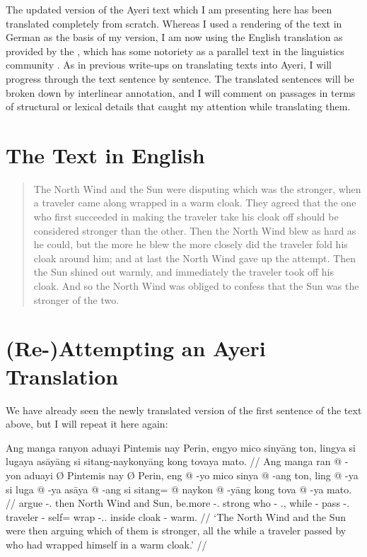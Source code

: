 \documentclass[12pt,paper=a4]{scrartcl}
\begin{document}
The updated version of the Ayeri text which I am presenting here has been translated completely from scratch. Whereas I used a rendering of the text in German as the basis of my \citeyear{becker2004} version, I am now using the English translation as provided by the , which has some notoriety as a parallel text in the linguistics community \autocite[see e.g.][97]{cysouwwälchli2007}. As in previous write-ups on translating texts into Ayeri, I will progress through the text sentence by sentence. The translated sentences will be broken down by interlinear annotation, and I will comment on passages in terms of structural or lexical details that caught my attention while translating them.

\section{The Text in English}

\blockcquote[???]{ipa2007}{The North Wind and the Sun were disputing which was the stronger, when a traveler came along wrapped in a warm cloak. They agreed that the one who first succeeded in making the traveler take his cloak off should be considered stronger than the other. Then the North Wind blew as hard as he could, but the more he blew the more closely did the traveler fold his cloak around him; and at last the North Wind gave up the attempt. Then the Sun shined out warmly, and immediately the traveler took off his cloak. And so the North Wind was obliged to confess that the Sun was the stronger of the two.}

\section{(Re-)Attempting an Ayeri Translation}

We have already seen the newly translated version of the first sentence of the text above, but I will repeat it here again:

\ex %
\begingl
	\glpreamble Ang manga ranyon aduayi Pintemis nay Perin, engyo mico sinyāng ton, lingya si lugaya asāyāng si sitang-naykonyāng kong tovaya mato. //
	\gla Ang manga ran @ -yon aduayi Ø Pintemis nay Ø Perin, eng @ -yo mico sinya @ -ang ton, ling @ -ya si luga @ -ya asāya @ -ang si sitang= @ naykon @ -yāng kong tova @ -ya mato. //
	\glb \AgtT{} \Prog{} argue -\Tpl{}.\N{} then \Top{} {North Wind} and \Top{} Sun, be.more -\Tsg{}.\N{} strong who -\Aarg{} \Tpl{}.\Gen{}, while -\Loc{} \Rel{} pass -\Tsg{}.\M{} traveler -\Aarg{} \Rel{} self= wrap -\Tsg{}.\M{}.\Aarg{} inside cloak -\Loc{} warm. //
	\glft `The North Wind and the Sun were then arguing which of them is stronger, all the while a traveler passed by who had wrapped himself in a warm cloak.' //
\endgl
\xe
\end{document}
